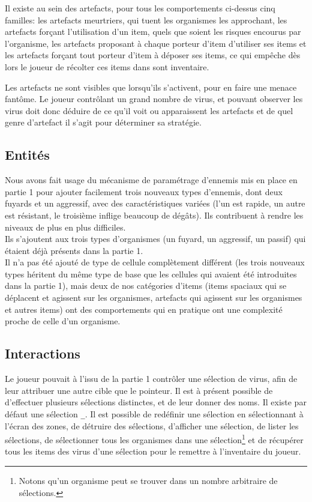 \documentclass[a4paper,french]{article}
\begin{document}
Il existe au sein des artefacts, pour tous les comportements ci-dessus cinq
familles: les artefacts meurtriers, qui tuent les organismes les approchant,
les artefacts forçant l'utilisation d'un item, quels que soient les risques
encourus par l'organisme, les artefacts proposant à chaque porteur d'item
d'utiliser ses items et les artefacts forçant tout porteur d'item à déposer ses
items, ce qui empêche dès lors le joueur de récolter ces items dans sont
inventaire.
\medskip

Les artefacts ne sont visibles que lorsqu'ils s'activent, pour en
faire une menace fantôme. Le joueur contrôlant un grand nombre de virus, et
pouvant observer les virus doit donc déduire de ce qu'il voit ou apparaissent
les artefacts et de quel genre d'artefact il s'agit pour déterminer sa
stratégie.


\subsection{Entit\'es}
Nous avons fait usage du m\'ecanisme de param\'etrage d'ennemis mis en place en partie 1 pour ajouter facilement trois nouveaux
types d'ennemis, dont deux fuyards et un aggressif, avec des caract\'eristiques vari\'ees (l'un est rapide, un autre est r\'esistant, le troisi\`eme
inflige beaucoup de d\'eg\^ats). Ils contribuent \`a rendre les niveaux de plus en plus difficiles.\\
Ils s'ajoutent aux trois types d'organismes (un fuyard, un aggressif, un passif) qui \'etaient d\'ej\`a pr\'esents dans la partie 1.\\

Il n'a pas \'et\'e ajout\'e de type de cellule compl\`etement diff\'erent (les trois nouveaux types h\'eritent du m\^eme type de base que
les cellules qui avaient \'et\'e introduites dans la partie 1), mais deux de nos cat\'egories d'items (items spaciaux qui se d\'eplacent et agissent sur
les organismes, artefacts qui agissent sur les organismes et autres items) ont des comportements qui en pratique
ont une complexit\'e proche de celle d'un organisme.

\subsection{Interactions}
Le joueur pouvait à l'issu de la partie 1 contrôler une sélection de virus, afin
de leur attribuer une autre cible que le pointeur. Il est à présent possible de
d'effectuer plusieurs sélections distinctes, et de leur donner des noms. Il
existe par défaut une sélection \texttt\_. Il est possible de redéfinir une
sélection en sélectionnant à l'écran des zones, de détruire des sélections,
d'afficher une sélection, de lister les sélections, de sélectionner tous les
organismes dans une sélection\footnote{Notons qu'un organisme peut se trouver
dans un nombre arbitraire de sélections.} et de récupérer tous les items des
virus d'une sélection pour le remettre à l'inventaire du joueur.\\
\end{document}
